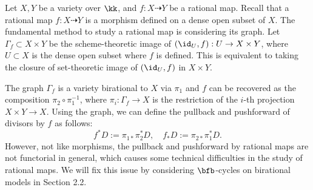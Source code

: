   Let $X,Y$ be a variety over $\kk$, and $f: X \dashrightarrow Y$ be a rational map.
  Recall that a rational map $f: X \dashrightarrow Y$ is a morphism defined on a dense open subset of $X$.
  The fundamental method to study a rational map is considering its graph.
  Let $\Gamma_f \subset X \times Y$ be the scheme-theoretic image of $(\id_U, f): U \to X \times Y$, where $U \subset X$ is the dense open subset where $f$ is defined.
  This is equivalent to taking the closure of set-theoretic image of $(\id_U, f)$ in $X \times Y$.

  The graph $\Gamma_f$ is a variety birational to $X$ via $\pi_1$ and $f$ can be recovered as the composition $\pi_2 \circ \pi_1^{-1}$, where $\pi_i: \Gamma_f \to X$ is the restriction of the $i$-th projection $X \times Y \to X$.
  Using the graph, we can define the pullback and pushforward of divisors by $f$ as follows:
  \[ f^*D := \pi_{1*} \pi_2^* D, \quad f_*D := \pi_{2*} \pi_1^* D. \]
  However, not like morphisms, the pullback and pushforward by rational maps are not functorial in general, which causes some technical difficulties in the study of rational maps.
  We will fix this issue by considering $\bfb$-cycles on birational models in Section 2.2.

